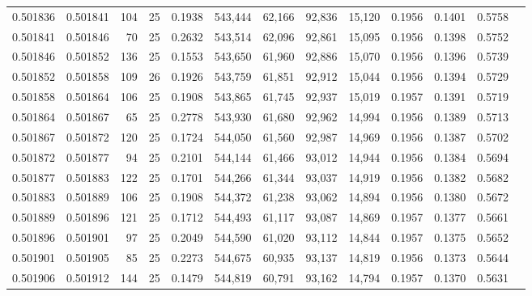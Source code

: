 \begin{tabular}{rrrrrrrrrrrrr}
0.501836 & 0.501841 & 104 &  25 &                                     0.1938 & 543,444 &  62,166 &  92,836 &  15,120 & 0.1956 & 0.1401 & 0.5758 \\
0.501841 & 0.501846 &  70 &  25 &                                     0.2632 & 543,514 &  62,096 &  92,861 &  15,095 & 0.1956 & 0.1398 & 0.5752 \\
0.501846 & 0.501852 & 136 &  25 &                                     0.1553 & 543,650 &  61,960 &  92,886 &  15,070 & 0.1956 & 0.1396 & 0.5739 \\
0.501852 & 0.501858 & 109 &  26 &                                     0.1926 & 543,759 &  61,851 &  92,912 &  15,044 & 0.1956 & 0.1394 & 0.5729 \\
0.501858 & 0.501864 & 106 &  25 &                                     0.1908 & 543,865 &  61,745 &  92,937 &  15,019 & 0.1957 & 0.1391 & 0.5719 \\
0.501864 & 0.501867 &  65 &  25 &                                     0.2778 & 543,930 &  61,680 &  92,962 &  14,994 & 0.1956 & 0.1389 & 0.5713 \\
0.501867 & 0.501872 & 120 &  25 &                                     0.1724 & 544,050 &  61,560 &  92,987 &  14,969 & 0.1956 & 0.1387 & 0.5702 \\
0.501872 & 0.501877 &  94 &  25 &                                     0.2101 & 544,144 &  61,466 &  93,012 &  14,944 & 0.1956 & 0.1384 & 0.5694 \\
0.501877 & 0.501883 & 122 &  25 &                                     0.1701 & 544,266 &  61,344 &  93,037 &  14,919 & 0.1956 & 0.1382 & 0.5682 \\
0.501883 & 0.501889 & 106 &  25 &                                     0.1908 & 544,372 &  61,238 &  93,062 &  14,894 & 0.1956 & 0.1380 & 0.5672 \\
0.501889 & 0.501896 & 121 &  25 &                                     0.1712 & 544,493 &  61,117 &  93,087 &  14,869 & 0.1957 & 0.1377 & 0.5661 \\
0.501896 & 0.501901 &  97 &  25 &                                     0.2049 & 544,590 &  61,020 &  93,112 &  14,844 & 0.1957 & 0.1375 & 0.5652 \\
0.501901 & 0.501905 &  85 &  25 &                                     0.2273 & 544,675 &  60,935 &  93,137 &  14,819 & 0.1956 & 0.1373 & 0.5644 \\
0.501906 & 0.501912 & 144 &  25 &                                     0.1479 & 544,819 &  60,791 &  93,162 &  14,794 & 0.1957 & 0.1370 & 0.5631 \\

\end{tabular}
